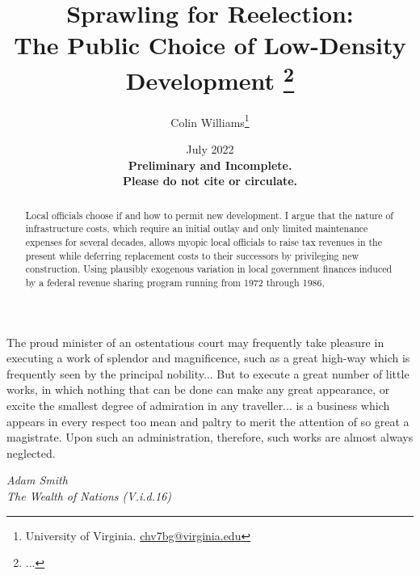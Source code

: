 \documentclass[12pt]{article}
\title{ \vspace*{-2.5cm} \hspace*{-0.5cm}Sprawling for Reelection: \\ The Public Choice of Low-Density Development \footnote{
...
}}
\author{Colin Williams\thanks{University of Virginia.
\href{mailto:chv7bg@virginia.edu}{chv7bg@virginia.edu}} }%
\date{ \vspace*{0.5cm} July 2022 \\
\textbf{Preliminary and Incomplete. \\ Please do not cite or circulate.}
}
\begin{document}
\bgroup
\let\footnoterule\relax

\begin{singlespace}
\maketitle


\begin{abstract}
     Local officials choose if and how to permit new development. I argue that the nature of infrastructure costs, which require an initial outlay and only limited maintenance expenses for several decades, allows myopic local officials to raise tax revenues in the present while deferring replacement costs to their successors by privileging new construction. Using plausibly exogenous variation in local government finances induced by a federal revenue sharing program running from 1972 through 1986,  
\end{abstract}
\end{singlespace}
\thispagestyle{empty}

\clearpage
\egroup
\setcounter{page}{1}



\noindent %


\epigraph{The proud minister of an ostentatious court may frequently take pleasure in executing a work of splendor and magnificence, such as a great high-way which is frequently seen by the principal nobility... But to execute a great number of little works, in which nothing that can be done can make any great appearance, or excite the smallest degree of admiration in any traveller... is a business which appears in every respect too mean and paltry to merit the attention of so great a magistrate. Upon such an administration, therefore, such works are almost always neglected.}{\textit{Adam Smith \\ The Wealth of Nations (V.i.d.16)}}
\end{document}
